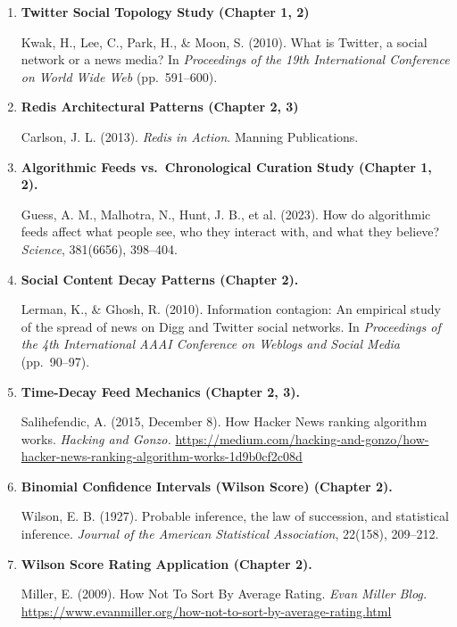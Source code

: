 
\begin{enumerate}[leftmargin=*, label=\arabic*., itemsep=0.8em]

  \item \textbf{Twitter Social Topology Study (Chapter 1, 2)}

  Kwak, H., Lee, C., Park, H., \& Moon, S. (2010). What is Twitter, a social network or a news media? In \textit{Proceedings of the 19th International Conference on World Wide Web} (pp.\ 591--600).

  \item \textbf{Redis Architectural Patterns (Chapter 2, 3)}

  Carlson, J. L. (2013). \textit{Redis in Action}. Manning Publications.

  \item \textbf{Algorithmic Feeds vs.\ Chronological Curation Study (Chapter 1, 2).}

  Guess, A. M., Malhotra, N., Hunt, J. B., et al. (2023). How do algorithmic feeds affect what people see, who they interact with, and what they believe? \textit{Science}, 381(6656), 398--404.

  \item \textbf{Social Content Decay Patterns (Chapter 2).}

  Lerman, K., \& Ghosh, R. (2010). Information contagion: An empirical study of the spread of news on Digg and Twitter social networks. In \textit{Proceedings of the 4th International AAAI Conference on Weblogs and Social Media} (pp.\ 90--97).

  \item \textbf{Time-Decay Feed Mechanics (Chapter 2, 3).}

  Salihefendic, A. (2015, December 8). How Hacker News ranking algorithm works. \textit{Hacking and Gonzo.} \url{https://medium.com/hacking-and-gonzo/how-hacker-news-ranking-algorithm-works-1d9b0cf2c08d}

  \item \textbf{Binomial Confidence Intervals (Wilson Score) (Chapter 2).}

  Wilson, E. B. (1927). Probable inference, the law of succession, and statistical inference. \textit{Journal of the American Statistical Association}, 22(158), 209--212.

  \item \textbf{Wilson Score Rating Application (Chapter 2).}

  Miller, E. (2009). How Not To Sort By Average Rating. \textit{Evan Miller Blog.} \url{https://www.evanmiller.org/how-not-to-sort-by-average-rating.html}


\end{enumerate}

